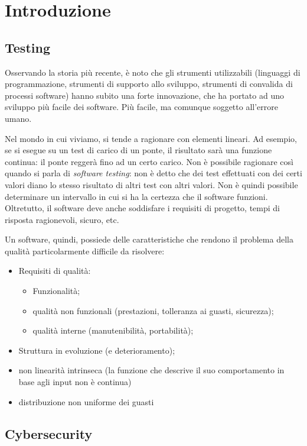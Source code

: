 \section{Introduzione}

\subsection{Testing}

Osservando la storia più recente, è noto che gli strumenti utilizzabili (linguaggi di programmazione, strumenti di supporto allo sviluppo, strumenti di convalida di processi software) hanno subito una forte innovazione, che ha portato ad uno sviluppo più facile dei software. Più facile, ma comunque soggetto all'errore umano.

Nel mondo in cui viviamo, si tende a ragionare con elementi lineari. Ad esempio, se si esegue su un test di carico di un ponte, il risultato sarà una funzione continua: il ponte reggerà fino ad un certo carico. Non è possibile ragionare così quando si parla di \textit{software testing}: non è detto che dei test effettuati con dei certi valori diano lo stesso risultato di altri test con altri valori. Non è quindi possibile determinare un intervallo in cui si ha la certezza che il software funzioni. Oltretutto, il software deve anche soddisfare i requisiti di progetto, tempi di risposta ragionevoli, sicuro, etc.

Un software, quindi, possiede delle caratteristiche che rendono il problema della qualità particolarmente difficile da risolvere: \begin{itemize}
    \item Requisiti di qualità: \begin{itemize}
        \item Funzionalità;
        \item qualità non funzionali (prestazioni, tolleranza ai guasti, sicurezza);
        \item qualità interne (manutenibilità, portabilità);
    \end{itemize}
    \item Struttura in evoluzione (e deterioramento);
    \item non linearità intrinseca (la funzione che descrive il suo comportamento in base agli input non è continua)
    \item distribuzione non uniforme dei guasti
\end{itemize}

\subsection{Cybersecurity}

